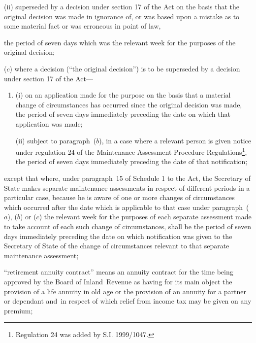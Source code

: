 \documentclass[12pt,a4paper]{article}
\begin{document}
\begin{enumerate}
\begin{enumerate}
\begin{enumerate}
    (ii)
    superseded by a decision under section 17 of the Act on the basis that the original decision was made in ignorance of, or was based upon a mistake as to some material fact or was erroneous in point of law,
\end{enumerate}
    the period of seven days which was the relevant week for the purposes of the original decision;

    ($c$)
    where a decision (“the original decision”) is to be superseded by a decision under section 17 of the Act—
\begin{enumerate}\item[]
    (i)
    on an application made for the purpose on the basis that a material change of circumstances has occurred since the original decision was made, the period of seven days immediately preceding the date on which that application was made;

    (ii)
    subject to paragraph~($b$), in a case where a relevant person is given notice under regulation 24 of the Maintenance Assessment Procedure Regulations\footnote{\frenchspacing Regulation 24 was added by S.I. 1999/1047.}, the period of seven days immediately preceding the date of that notification;
\end{enumerate}
\end{enumerate}
    except that where, under paragraph~15 of Schedule 1 to the Act, the Secretary of State makes separate maintenance assessments in respect of different periods in a particular case, because he is aware of one or more changes of circumstances which occurred after the date which is applicable to that case under paragraph~($a$), ($b$) or ($c$) the relevant week for the purposes of each separate assessment made to take account of each such change of circumstances, shall be the period of seven days immediately preceding the date on which notification was given to the Secretary of State of the change of circumstances relevant to that separate maintenance assessment;


“retirement annuity contract” means an annuity contract for the time being approved by the Board of Inland~Revenue as having for its main object the provision of a life annuity in old age or the provision of an annuity for a partner or dependant and~in respect of which relief from income tax may be given on any premium;


\end{enumerate}
\end{document}
